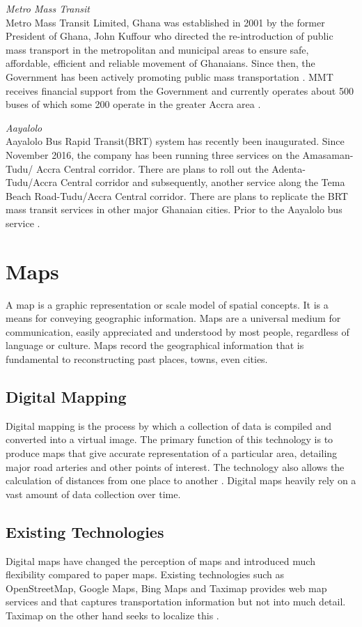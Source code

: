 \textit{Metro Mass Transit}\\
Metro  Mass  Transit  Limited, Ghana was established in 2001 by the former President of Ghana, John Kuffour who directed the re-introduction of public mass transport in the metropolitan and municipal areas to ensure safe, affordable, efficient and reliable movement of Ghanaians. Since then, the Government has been actively promoting public mass transportation \citep{olateju2009appraisal}. MMT receives financial support from the Government and currently operates about 500 buses of which some 200 operate in the greater Accra area \citep{finn2009new}.

\textit{Aayalolo}\\
Aayalolo Bus Rapid Transit(BRT) system has recently been inaugurated. Since November 2016, the company has been running three services on the Amasaman-Tudu/
Accra Central corridor. There are plans to roll out the Adenta-Tudu/Accra Central corridor and subsequently, another service along the Tema Beach Road-Tudu/Accra Central corridor. There are plans to replicate the BRT mass transit services in other major Ghanaian cities. Prior to the Aayalolo bus service \citep{agyemang2017mode}.

\section{Maps}
A map is a graphic representation or scale model of spatial concepts. It is a means for conveying geographic information. Maps are a universal medium for communication, easily appreciated and understood by most people, regardless of language or culture. Maps record the geographical information that is fundamental to reconstructing past places, towns, even cities.

\subsection{Digital Mapping}
Digital mapping is the process by which a collection of data is compiled and converted into a virtual image. The primary function of this technology is to produce maps that give accurate representation of a particular area, detailing major road arteries and other points of interest. The technology also allows the calculation of distances from one place to another \cite{husbyjonathon2008}. Digital maps heavily rely on a vast amount of data collection over time.

\subsection{Existing Technologies}
Digital maps have changed the perception of maps and introduced much flexibility compared to paper maps. Existing technologies such as OpenStreetMap, Google Maps, Bing Maps and Taximap provides web map services and that captures transportation information but not into much detail. Taximap on the other hand seeks to localize this \citep{vinet2014arch}.

